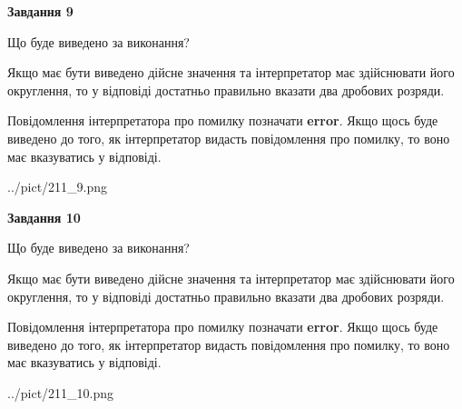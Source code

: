 \documentclass[12pt, ukrainian]{article}
\begin{document}
{\begin {Large}
{\begin {center}\textbf{Завдання 9}\end {center}}\par
Що буде виведено за виконання? \par

Якщо має бути виведено дійсне значення та інтерпретатор має здійснювати його округлення, 
то у відповіді достатньо правильно вказати два дробових розряди.

Повідомлення інтерпретатора про помилку позначати \textbf{error}.
Якщо щось буде виведено до того, як інтерпретатор видасть повідомлення про помилку, 
то воно має вказуватись у відповіді. \par

\begin{center}
	{../pict/211_9.png}
\end{center}
\newpage

{\begin {center}\textbf{Завдання 10}\end {center}}\par
Що буде виведено за виконання? \par

Якщо має бути виведено дійсне значення та інтерпретатор має здійснювати його округлення, 
то у відповіді достатньо правильно вказати два дробових розряди.

Повідомлення інтерпретатора про помилку позначати \textbf{error}.
Якщо щось буде виведено до того, як інтерпретатор видасть повідомлення про помилку, 
то воно має вказуватись у відповіді. \par

\begin{center}
	{../pict/211_10.png}
\end{center}
\newpage

\end {Large}}
\end{document}
